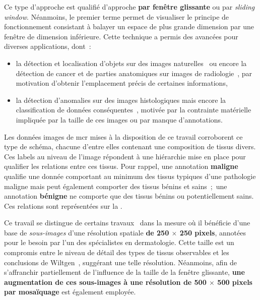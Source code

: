 Ce type d'approche est qualifié d'approche \textbf{par fenêtre glissante} ou par \textit{sliding window}. Néanmoins, le premier terme permet de visualiser le principe de fonctionnement consistant à balayer un espace de plus grande dimension par une fenêtre de dimension inférieure. Cette technique a permis des avancées pour diverses applications, dont~:~
\begin{itemize}
    \item la détection et localisation d'objets sur des images naturelles~\cite{Harzallah2009} ou encore la détection de cancer et de parties anatomiques sur images de radiologie~\cite{Helwan2017}, par motivation d'obtenir l'emplacement précis de certaines informations,
    \item la détection d'anomalies sur des images histologiques mais encore la classification de données conséquentes~\cite{Hou2016,Alqudah2019,Wei2019}, motivée par la contrainte matérielle impliquée par la taille de ces images ou par manque d'annotations.
\end{itemize}\par

Les données images de \gls{mcr} mises à la disposition de ce travail corroborent ce type de schéma, chacune d'entre elles contenant une composition de tissus divers. Ces labels au niveau de l'image répondent à une hiérarchie mise en place pour qualifier les relations entre ces tissus. Pour rappel, une annotation \textbf{maligne} qualifie une donnée comportant au minimum des tissus typiques d'une pathologie maligne mais peut également comporter des tissus bénins et sains~;~une annotation \textbf{bénigne} ne comporte que des tissus bénins ou potentiellement sains. Ces relations sont représentées sur la .\par

Ce travail se distingue de certains travaux~\cite{Hou2016,Alqudah2019} dans la mesure où il bénéficie d'une base de \textit{sous-images} d'une résolution spatiale \textbf{de 250 $\times$ 250 pixels}, annotées pour le besoin par l'un des spécialistes en dermatologie. Cette taille est un compromis entre le niveau de détail des types de tissus observables et les conclusions de Wiltgen~, suggérant une telle résolution. Néanmoins, afin de s'affranchir partiellement de l'influence de la taille de la fenêtre glissante, \textbf{une augmentation de ces sous-images à une résolution \textbf{de 500 $\times$ 500 pixels} par mosaïquage} est également employée.\par

